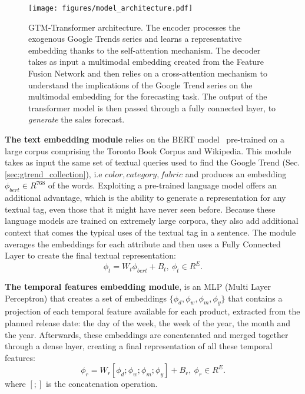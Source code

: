 \documentclass{article}
\newcommand{\approachname}[0] {GTM-Transformer\xspace}
\begin{document}
\begin{figure}[t]
    \centering
    \texttt{[image: figures/model\_architecture.pdf]}
    \caption{\approachname{} architecture. The encoder processes the exogenous Google Trends series and learns a representative embedding thanks to the self-attention mechanism. The decoder takes as input a multimodal embedding created from the Feature Fusion Network and then relies on a cross-attention mechanism to understand the implications of the Google Trend series on the multimodal embedding for the forecasting task. The output of the transformer model is then passed through a fully connected layer, to \textit{generate} the sales forecast.}
    \label{fig:model_architecture}
\end{figure}

\textbf{The text embedding module} relies on the BERT model~\cite{devlin2019bert} pre-trained on a large corpus comprising the Toronto Book Corpus and Wikipedia. This module takes as input the same set of textual queries used to find the Google Trend (Sec. \ref{sec:gtrend_collection}), i.e ${color,category, fabric}$ and produces an embedding $\phi_{bert} \in R^{768}$ of the words. Exploiting a pre-trained language model offers an additional advantage, which is the ability to generate a representation for any textual tag, even those that it might have never seen before. Because these language models are trained on extremely large corpora, they also add additional context that comes the typical uses of the textual tag in a sentence. The module averages the embeddings for each attribute and then uses a Fully Connected Layer to create the final textual representation: 
\begin{equation}\label{eq}
    \phi_t = W_t \phi_{bert}  + B_t,\: \phi_t \in R^E.
\end{equation}

\textbf{The temporal features embedding module}, is an MLP (Multi Layer Perceptron) that creates a set of embeddings $\{\phi_d, \phi_w, \phi_m, \phi_y\}$ that contains a projection of each temporal feature available for each product, extracted from the planned release date: the day of the week, the week of the year, the month and the year. Afterwards, these embeddings are concatenated and merged together through a dense layer, creating a final representation of all these temporal features:
\begin{equation}\label{eq}
    \phi_r = W_r [\phi_d ; \phi_w; \phi_m; \phi_y ]  + B_r,\: \phi_r \in R^E.
\end{equation}
 where $[;]$ is the concatenation operation.
\end{document}
